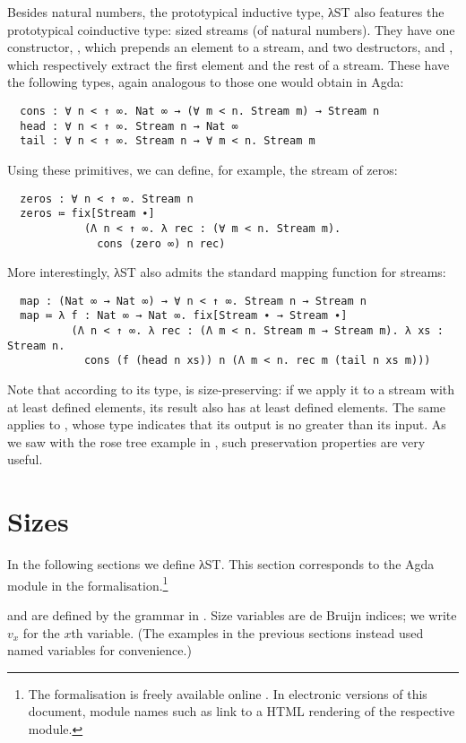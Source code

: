 Besides natural numbers, the prototypical inductive type, λST also features the
prototypical coinductive type: sized streams (of natural numbers). They have one
constructor, , which prepends an element to a stream, and two
destructors,  and , which respectively extract the first
element and the rest of a stream. These have the following types, again
analogous to those one would obtain in Agda:
\begin{verbatim}
  cons : ∀ n < ↑ ∞. Nat ∞ → (∀ m < n. Stream m) → Stream n
  head : ∀ n < ↑ ∞. Stream n → Nat ∞
  tail : ∀ n < ↑ ∞. Stream n → ∀ m < n. Stream m
\end{verbatim}
Using these primitives, we can define, for example, the stream of zeros:
\begin{verbatim}
  zeros : ∀ n < ↑ ∞. Stream n
  zeros ≔ fix[Stream ∙]
            (Λ n < ↑ ∞. λ rec : (∀ m < n. Stream m).
              cons (zero ∞) n rec)
\end{verbatim}
More interestingly, λST also admits the standard mapping function for streams:
\begin{verbatim}
  map : (Nat ∞ → Nat ∞) → ∀ n < ↑ ∞. Stream n → Stream n
  map ≔ λ f : Nat ∞ → Nat ∞. fix[Stream ∙ → Stream ∙]
          (Λ n < ↑ ∞. λ rec : (Λ m < n. Stream m → Stream m). λ xs : Stream n.
            cons (f (head n xs)) n (Λ m < n. rec m (tail n xs m)))
\end{verbatim}
Note that according to its type,  is size-preserving: if we apply it
to a stream with at least  defined elements, its result also has at
least  defined elements. The same applies to , whose type
indicates that its output is no greater than its input. As we saw with the rose
tree example in , such preservation properties are very
useful.


\section{Sizes}
\label{sec:source:sizes}

In the following sections we define λST. This section corresponds to the Agda
module  in the
formalisation.\footnote{The formalisation is freely available online
  \cite{limperg2019code}. In electronic versions of this document, module names
  such as  link to a HTML rendering
  of the respective module.}

 and  are defined by the grammar in
. Size variables are de Bruijn indices; we write $v_x$ for
the $x$th variable. (The examples in the previous sections instead used named
variables for convenience.)

